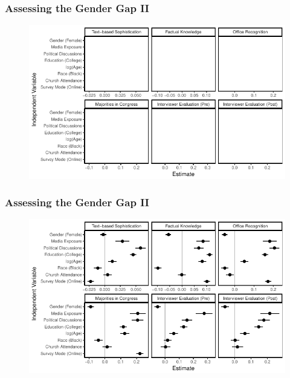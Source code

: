 \documentclass{beamer}
\begin{document}
\begin{frame} %
\frametitle{Assessing the Gender Gap II}
  \begin{figure}
  \includegraphics[width = \textwidth]{../fig/determinants_empty.pdf}
  \end{figure}
\end{frame}
\begin{frame} %
\frametitle{Assessing the Gender Gap II}
  \begin{figure}
  \includegraphics[width = \textwidth]{../fig/determinants.pdf}
  \end{figure}
\end{frame}

\end{document}
